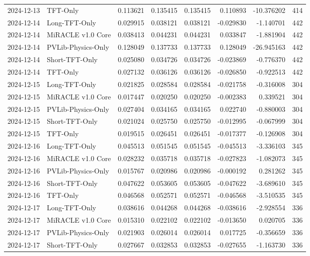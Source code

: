\begin{tabular}{llrrrrrr}
2024-12-13 & TFT-Only & 0.113621 & 0.135415 & 0.135415 & 0.110893 & -10.376202 & 414 \\
2024-12-14 & Long-TFT-Only & 0.029915 & 0.038121 & 0.038121 & -0.029830 & -1.140701 & 442 \\
2024-12-14 & MiRACLE v1.0 Core & 0.038413 & 0.044231 & 0.044231 & 0.033847 & -1.881904 & 442 \\
2024-12-14 & PVLib-Physics-Only & 0.128049 & 0.137733 & 0.137733 & 0.128049 & -26.945163 & 442 \\
2024-12-14 & Short-TFT-Only & 0.025080 & 0.034726 & 0.034726 & -0.023869 & -0.776370 & 442 \\
2024-12-14 & TFT-Only & 0.027132 & 0.036126 & 0.036126 & -0.026850 & -0.922513 & 442 \\
2024-12-15 & Long-TFT-Only & 0.021825 & 0.028584 & 0.028584 & -0.021758 & -0.316008 & 304 \\
2024-12-15 & MiRACLE v1.0 Core & 0.017447 & 0.020250 & 0.020250 & -0.002383 & 0.339521 & 304 \\
2024-12-15 & PVLib-Physics-Only & 0.027404 & 0.034165 & 0.034165 & 0.022740 & -0.880003 & 304 \\
2024-12-15 & Short-TFT-Only & 0.021024 & 0.025750 & 0.025750 & -0.012995 & -0.067999 & 304 \\
2024-12-15 & TFT-Only & 0.019515 & 0.026451 & 0.026451 & -0.017377 & -0.126908 & 304 \\
2024-12-16 & Long-TFT-Only & 0.045513 & 0.051545 & 0.051545 & -0.045513 & -3.336103 & 345 \\
2024-12-16 & MiRACLE v1.0 Core & 0.028232 & 0.035718 & 0.035718 & -0.027823 & -1.082073 & 345 \\
2024-12-16 & PVLib-Physics-Only & 0.015767 & 0.020986 & 0.020986 & -0.000192 & 0.281262 & 345 \\
2024-12-16 & Short-TFT-Only & 0.047622 & 0.053605 & 0.053605 & -0.047622 & -3.689610 & 345 \\
2024-12-16 & TFT-Only & 0.046568 & 0.052571 & 0.052571 & -0.046568 & -3.510535 & 345 \\
2024-12-17 & Long-TFT-Only & 0.038616 & 0.044268 & 0.044268 & -0.038616 & -2.928554 & 336 \\
2024-12-17 & MiRACLE v1.0 Core & 0.015310 & 0.022102 & 0.022102 & -0.013650 & 0.020705 & 336 \\
2024-12-17 & PVLib-Physics-Only & 0.021903 & 0.026014 & 0.026014 & 0.017725 & -0.356659 & 336 \\
2024-12-17 & Short-TFT-Only & 0.027667 & 0.032853 & 0.032853 & -0.027655 & -1.163730 & 336 \\

\end{tabular}
